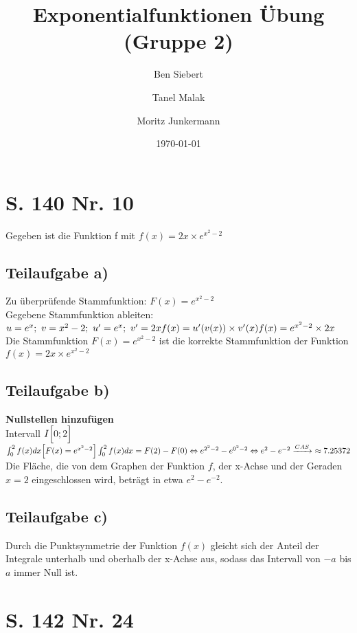 \documentclass[11pt, a4paper]{report}
\begin{document}
	\title{Exponentialfunktionen Übung (Gruppe 2)}
	\author{Ben Siebert \and Tanel Malak \and Moritz Junkermann}
	\date{\today}
	\maketitle
	\tableofcontents
	\bsremovechaptertitle
	\chapter{S. 140 Nr. 10}
	Gegeben ist die Funktion f mit $f(x) = 2x \times e^{x^2-2}$
	\section{Teilaufgabe a)}
	Zu überprüfende Stammfunktion: $F(x) = e^{x^2-2}$ \\
	Gegebene Stammfunktion ableiten: \\
	$u = e^x;\ v = x^2 - 2;\ u' = e^x;\ v' = 2x\\
	f(x) = u'(v(x)) \times v'(x) \\
	f(x) = e^{x^2 - 2} \times 2x \\
	$
	Die Stammfunktion $F(x) = e^{x^2-2}$ ist die korrekte Stammfunktion der Funktion $f(x) = 2x \times e^{x^2-2}$
	\section{Teilaufgabe b)}
	\textbf{Nullstellen hinzufügen} \\
	Intervall $I\Bigl[0;2\Bigl]$ \\
	$
	\int_{0}^{2}f(x) dx \Bigl[F(x) = e^{x^2-2}\Bigl]\\
	\int_{0}^{2}f(x) dx = F(2) - F(0) \\
	\Leftrightarrow e^{2^2-2} - e^{0^2-2} \\
	\Leftrightarrow e^{2} - e^{-2} \\
	\xrightarrow[]{CAS}\ \approx 7.25372 \\
	$
	Die Fläche, die von dem Graphen der Funktion $f$, der x-Achse und der Geraden $x=2$ eingeschlossen wird, beträgt in etwa $e^2 - e^{-2}$.
	\section{Teilaufgabe c)}
	Durch die Punktsymmetrie der Funktion $f(x)$ gleicht sich der Anteil der Integrale unterhalb und oberhalb der x-Achse aus, sodass das Intervall von $-a$ bis $a$ immer Null ist.
	\chapter{S. 142 Nr. 24}
\end{document}
